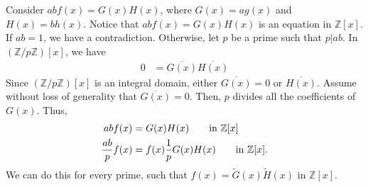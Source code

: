 \documentclass[10pt]{extarticle}
\newcommand{\Z}{\mathbb{Z}}
\begin{document}
  Consider $ab f(x) = G(x)H(x)$, where $G(x) = ag(x)$ and $H(x) = bh(x)$. Notice that $abf(x) = G(x)H(x)$ is an equation in $\Z[x]$. If $ab = 1$, we have a contradiction. Otherwise, let $p$ be a prime such that $p|ab$. In $(\Z/p\Z)[x]$, we have
  \begin{align*}
    0 &= \overline{G(x)}\overline{H(x)}
  \end{align*}
  Since $(\Z/p\Z)[x]$ is an integral domain, either $\overline{G(x)} = 0$ or $\overline{H(x)}$. Assume without loss of generality that $\overline{G(x)} = 0$. Then, $p$ divides all the coefficients of $G(x)$. Thus,
  \begin{align*}
    abf(x) &= G(x)H(x)\tag*{in $\Z[x]$}\\
    \frac{ab}{p}f(x) &= f(x)\frac{1}{p}G(x)H(x)\tag*{in $\Z[x]$.}
  \end{align*}
  We can do this for every prime, such that $f(x) = \tilde{G}(x)\tilde{H}(x)$ in $\Z[x]$.
\end{document}
